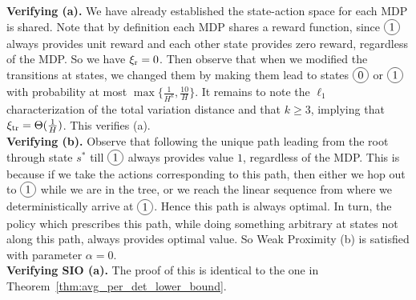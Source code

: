\documentclass[11pt,twoside]{article}
\begin{document}
\noindent \textbf{Verifying \weakprox{} (a).} We have already established the state-action space for each MDP is shared. Note that by definition each MDP shares a reward function, since $\circled{1}$ always provides unit reward and each other state provides zero reward, regardless of the MDP. So we have $\operatorname{\xi_r} = 0$. Then observe that when we modified the transitions at states, we changed them by making them lead to states $\circled{0}$ or $\circled{1}$ with probability at most $\max \{ \frac{1}{H^k}, \frac{10}{H} \}$. It remains to note the $\ell_1$ characterization of the total variation distance and that $k \geq 3$, implying that $\operatorname{\xi_{tr}} = \Theta(\frac{1}{H})$. This verifies \weakprox{} (a). \\

\noindent \textbf{Verifying \weakprox{} (b).} Observe that following the unique path leading from the root through state $s^*$ till $\circled{1}$ always provides value $1$, regardless of the MDP. This is because if we take the actions corresponding to this path, then either we hop out to $\circled{1}$ while we are in the tree, or we reach the linear sequence from where we deterministically arrive at $\circled{1}$. Hence this path is always optimal. In turn, the policy which prescribes this path, while doing something arbitrary at states not along this path, always provides optimal value. So Weak Proximity (b) is satisfied with parameter $\alpha = 0$. \\

\noindent \textbf{Verifying SIO (a).} The proof of this is identical to the one in Theorem~\ref{thm:avg_per_det_lower_bound}. \\
\end{document}
